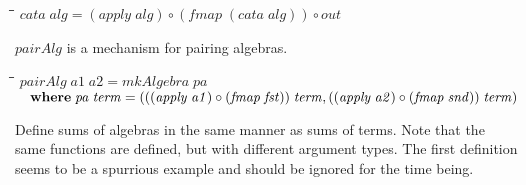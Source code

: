 \documentclass[10pt]{article}
\newlength{\lwidth}\setlength{\lwidth}{4.5cm}
\newlength{\cwidth}\setlength{\cwidth}{8mm} %
\newcommand{\Varid}[1]{\mathit{#1}}
\begin{document}
\begin{tabbing}
\qquad\=\hspace{\lwidth}\=\hspace{\cwidth}\=\+\kill
${\Varid{cata}\;\Varid{alg}\mathrel{=}(\Varid{apply}\;\Varid{alg})\mathbin{\circ}(\Varid{fmap}\;(\Varid{cata}\;\Varid{alg}))\mathbin{\circ}\Varid{out}}$
\end{tabbing}
\ensuremath{\Varid{pairAlg}} is a mechanism for pairing algebras.

\begin{tabbing}
\qquad\=\hspace{\lwidth}\=\hspace{\cwidth}\=\+\kill
${\Varid{pairAlg}\;\Varid{a1}\;\Varid{a2}\mathrel{=}\Varid{mkAlgebra}\;\Varid{pa}}$\\
${\hskip1.00em\relax\mathbf{where}\;\Varid{pa}\;\Varid{term}\mathrel{=}(((\Varid{apply}\;\Varid{a1})\mathbin{\circ}(\Varid{fmap}\;\Varid{fst}))\;\Varid{term},((\Varid{apply}\;\Varid{a2})\mathbin{\circ}(\Varid{fmap}\;\Varid{snd}))\;\Varid{term})}$
\end{tabbing}
Define sums of algebras in the same manner as sums of terms.  Note
that the same functions are defined, but with different argument
types.  The first definition seems to be a spurrious example and
should be ignored for the time being.
\end{document}
